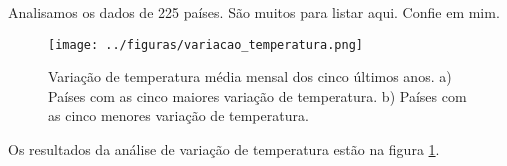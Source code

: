 \documentclass{article}
\begin{document}
Analisamos os dados de 225 países. São muitos para listar aqui. Confie em mim.

\begin{figure}[htb]
	\centering
	\texttt{[image: ../figuras/variacao\_temperatura.png]}
	\caption{
		Variação de temperatura média mensal dos cinco últimos anos.
		a) Países com as cinco maiores variação de temperatura.
		b) Países com as cinco menores variação de temperatura.
	}
	\label{fig:variacao}
\end{figure}

Os resultados da análise de variação de temperatura estão na figura \ref{fig:variacao}.



\end{document}
